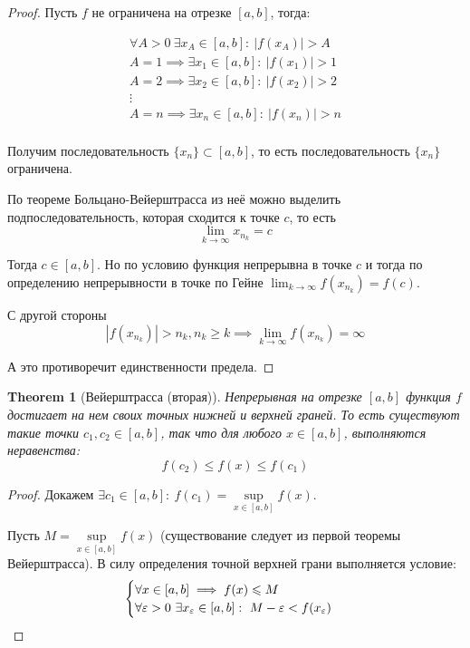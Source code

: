 \documentclass[a4paper]{article}
\theoremstyle{named}
\newtheorem*{namedtheorem}{Theorem}
\begin{document}
\begin{colloq}
\begin{proof}
			Пусть $f$ не ограничена на отрезке $[a, b]$, тогда:

			\[\begin{gathered}
				\forall A > 0 \ \exists x_A \in [a, b]: \ |f(x_A)| > A \\
				A = 1 \implies \exists x_1 \in [a, b]: \ |f(x_1)| > 1 \\
				A = 2 \implies \exists x_2 \in [a, b]: \ |f(x_2)| > 2 \\
				\vdots \\
				A = n \implies \exists x_n \in [a, b]: \ |f(x_n)| > n \\
			\end{gathered}\]

			Получим последовательность $\{x_n\} \subset [a, b]$, то есть последовательность $\{x_n\}$ ограничена.

			По теореме Больцано-Вейерштрасса из неё можно выделить подпоследовательность, которая сходится к точке $c$, то есть
			\begin{equation*}
				\lim_{k \to \infty} x_{n_k} = c
			\end{equation*}

			Тогда $c \in [a, b]$. Но по условию функция непрерывна в точке $c$ и тогда по определению непрерывности в точке по Гейне $\lim_{k \to \infty} f(x_{n_k}) = f(c)$.

			С другой стороны
			\begin{equation*}
				|f(x_{n_k})| > n_k, n_k \geq k \implies \lim_{k \to \infty} f(x_{n_k}) = \infty
			\end{equation*}

			А это противоречит единственности предела.
		\end{proof}

		\begin{namedtheorem}[Вейерштрасса (вторая)]
			Непрерывная на отрезке $[a, b]$ функция $f$ достигает на нем своих точных нижней и верхней граней. То есть существуют такие точки $c_1, c_2 \in [a, b]$, так что для любого $x \in [a, b]$, выполняются неравенства:
			\begin{equation*}
				f(c_2) \leq f(x) \leq f(c_1)
			\end{equation*}
		\end{namedtheorem}

		\begin{proof}
			Докажем $\exists c_1 \in [a, b]: \ f(c_1) = \sup\limits_{x \in [a, b]} f(x)$.

			Пусть $M = \sup\limits_{x \in [a, b]} f(x)$ (существование следует из первой теоремы Вейерштрасса). В силу определения точной верхней грани выполняется условие:
			\begin{equation*}
				\begin{cases}
					\forall x \in [a, b] \implies f(x) \leq M \\
					\forall \eps > 0 \ \exists x_{\eps} \in [a, b]: \ M - \eps < f(x_{\eps}) \\
				\end{cases}
			\end{equation*}


\end{proof}
\end{colloq}
\end{document}
